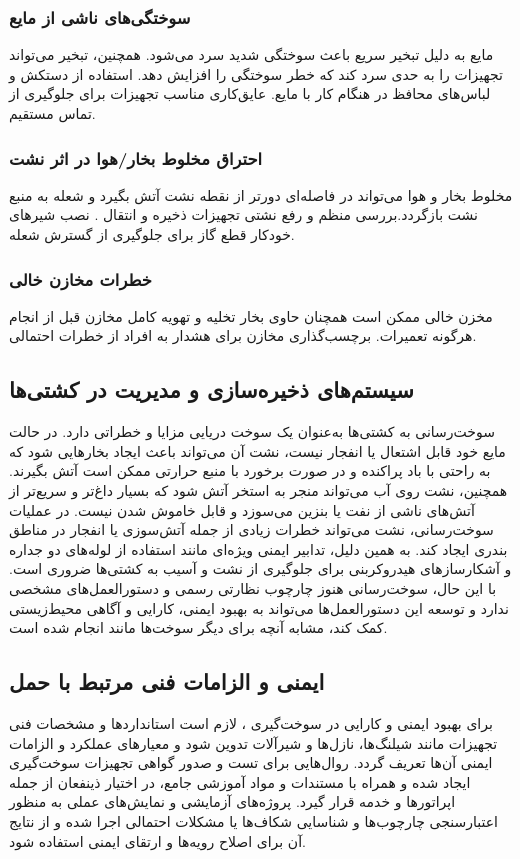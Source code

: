 \subsubsection{سوختگی‌های ناشی از مایع}
 مایع به دلیل تبخیر سریع باعث سوختگی شدید سرد می‌شود. همچنین، تبخیر می‌تواند تجهیزات را به حدی سرد کند که خطر سوختگی را افزایش دهد.
 استفاده از دستکش و لباس‌های محافظ در هنگام کار با 
  مایع.
 عایق‌کاری مناسب تجهیزات برای جلوگیری از تماس مستقیم.
\subsubsection{احتراق مخلوط بخار/هوا در اثر نشت}
مخلوط بخار 
و هوا می‌تواند در فاصله‌ای دورتر از نقطه نشت آتش بگیرد و شعله به منبع نشت بازگردد.بررسی منظم و رفع نشتی تجهیزات ذخیره و انتقال .
نصب شیرهای خودکار قطع گاز برای جلوگیری از گسترش شعله.
\subsubsection{خطرات مخازن خالی}
مخزن خالی
  ممکن است همچنان حاوی بخار
تخلیه و تهویه کامل مخازن قبل از انجام هرگونه تعمیرات.
برچسب‌گذاری مخازن برای هشدار به افراد از خطرات احتمالی.
\subsection{سیستم‌های ذخیره‌سازی و مدیریت 
	در کشتی‌ها}
سوخت‌رسانی
  به کشتی‌ها به‌عنوان یک سوخت دریایی مزایا و خطراتی دارد. 
   در حالت مایع خود قابل اشتعال یا انفجار نیست، نشت آن می‌تواند باعث ایجاد بخارهایی شود که به راحتی با باد پراکنده و در صورت برخورد با منبع حرارتی ممکن است آتش بگیرند. همچنین، نشت
    روی آب می‌تواند منجر به استخر آتش
     شود که بسیار داغ‌تر و سریع‌تر از آتش‌های ناشی از نفت یا بنزین می‌سوزد و قابل خاموش شدن نیست. در عملیات سوخت‌رسانی، نشت 
    می‌تواند خطرات زیادی از جمله آتش‌سوزی یا انفجار در مناطق بندری ایجاد کند. به همین دلیل، تدابیر ایمنی ویژه‌ای مانند استفاده از لوله‌های دو جداره و آشکارسازهای هیدروکربنی برای جلوگیری از نشت و آسیب به کشتی‌ها ضروری است. با این حال، سوخت‌رسانی
     هنوز چارچوب نظارتی رسمی و دستورالعمل‌های مشخصی ندارد و توسعه این دستورالعمل‌ها می‌تواند به بهبود ایمنی، کارایی و آگاهی محیط‌زیستی کمک کند، مشابه آنچه برای دیگر سوخت‌ها مانند 
     انجام شده است.
\subsection{ایمنی و الزامات فنی مرتبط با حمل }
برای بهبود ایمنی و کارایی در سوخت‌گیری ، لازم است استانداردها و مشخصات فنی تجهیزات مانند شیلنگ‌ها، نازل‌ها و شیرآلات تدوین شود و معیارهای عملکرد و الزامات ایمنی آن‌ها تعریف گردد. روال‌هایی برای تست و صدور گواهی تجهیزات سوخت‌گیری ایجاد شده و همراه با مستندات و مواد آموزشی جامع، در اختیار ذینفعان از جمله اپراتورها و خدمه قرار گیرد. پروژه‌های آزمایشی و نمایش‌های عملی به منظور اعتبارسنجی چارچوب‌ها و شناسایی شکاف‌ها یا مشکلات احتمالی اجرا شده و از نتایج آن برای اصلاح رویه‌ها و ارتقای ایمنی استفاده شود.

